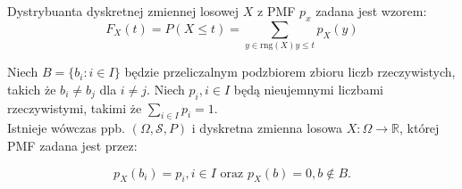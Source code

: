\documentclass{article}
\newenvironment{fact}[1]{%
    \trivlist
    \item[\hskip\labelsep\textbf{Fact. #1.}]
    \ignorespaces
}{%
    \endtrivlist
}
\newenvironment{theorem}[1]{%
    \trivlist
    \item[\hskip\labelsep\textbf{Theorem. #1.}]
    \ignorespaces
}{%
    \endtrivlist
}
\begin{document}
\begin{fact}{Wzór na Dystrybuantę}
    Dystrybuanta dyskretnej zmiennej losowej $X$ z PMF $p_x$ zadana jest wzorem:
    \[
    F_X(t) = P(X\leq t) = \sum_{y\in \text{rng}(X) y\leq t} p_X(y)
    \]
\end{fact}

\begin{theorem}{Istnienie zmiennej losowej o zadanym rozkładzie dyskretnym}
    Niech $B=\{b_i: i\in I\}$ będzie przeliczalnym podzbiorem zbioru liczb rzeczywistych, takich że $b_i \neq b_j$ dla $i\neq j$. Niech $p_i, i\in I$ będą nieujemnymi liczbami rzeczywistymi, takimi że $\sum_{i\in I} p_i = 1$.\\

    \noindent
    Istnieje wówczas ppb. $(\Omega, \mathcal{S}, P)$ i dyskretna zmienna losowa $X:\Omega \rightarrow \mathbb{R}$, której PMF zadana jest przez:

    \[
    p_X(b_i)=p_i, i\in I \text{ oraz } p_X(b) = 0, b \notin B.
    \]
\end{theorem}
\end{document}
